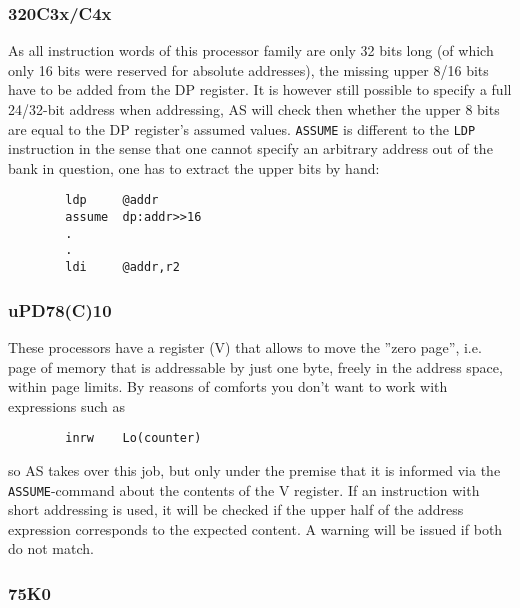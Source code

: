 \documentclass[12pt,twoside]{report}
\newcommand{\tty}[1]{{\tt #1}}
\newcommand{\asname}{{AS}}
\begin{document}

\subsubsection{320C3x/C4x}

As all instruction words of this processor family are only 32 bits
long (of which only 16 bits were reserved for absolute addresses),
the missing upper 8/16 bits have to be added from the DP register.  It
is however still possible to specify a full 24/32-bit address when
addressing, \asname{} will check then whether the upper 8 bits are equal to
the DP register's assumed values.  \tty{ASSUME} is different to the
\tty{LDP} instruction in the sense that one cannot specify an arbitrary
address out of the bank in question, one has to extract the upper bits by
hand:
\begin{verbatim}
        ldp     @addr
        assume  dp:addr>>16
        .
        .
        ldi     @addr,r2
\end{verbatim}


\subsubsection{uPD78(C)10}

These processors have a register (V) that allows to move the ''zero
page'', i.e. page of memory that is addressable by just one byte,
freely in the address space, within page limits.  By reasons of
comforts you don't want to work with expressions such as
\begin{verbatim}
        inrw    Lo(counter)
\end{verbatim}
so \asname{} takes over this job, but only under the premise that it is informed
via the \tty{ASSUME}-command about the contents of the V register.  If an
instruction with short addressing is used, it will be checked if the upper
half of the address expression corresponds to the expected content.  A
warning will be issued if both do not match.


\subsubsection{75K0}
\end{document}
